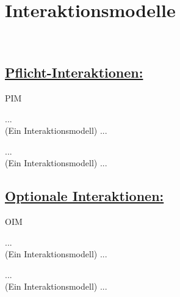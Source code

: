 %
%


%
%
\clearpage


\section{Interaktionsmodelle}
\label{NU:Interaktion}~\\


\subsection*{\underline{Pflicht-Interaktionen:}}

\begin{ids}{\gls{PIM}}

	\id[ 1] ... \hfill\\
	
	(Ein Interaktionsmodell) ...
	
	\id[10] ... \hfill\\
	
	(Ein Interaktionsmodell) ...

\end{ids}


%
%
\clearpage


\subsection*{\underline{Optionale Interaktionen:}}

\begin{ids}{\gls{OIM}}

	\id[ 11] ... \hfill\\
	
	(Ein Interaktionsmodell) ...
	
	\id[100] ... \hfill\\
	
	(Ein Interaktionsmodell) ...

\end{ids}


